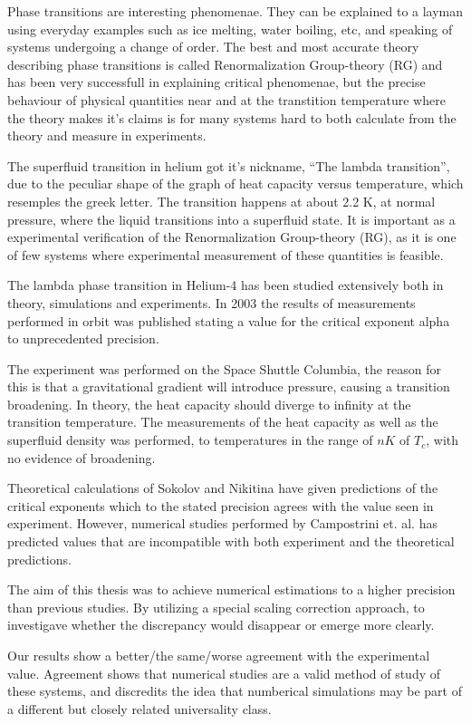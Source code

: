 %

Phase transitions are interesting phenomenae. They can be explained to a layman using everyday examples such as ice melting, water boiling, etc, and speaking of systems undergoing a change of order. The best and most accurate theory describing phase transitions is called Renormalization Group-theory (RG) and has been very successfull in explaining critical phenomenae, but the precise behaviour of physical quantities near and at the transtition temperature where the theory makes it's claims is for many systems hard to both calculate from the theory and measure in experiments.

The superfluid transition in helium got it's nickname, ``The lambda transition'', due to the peculiar shape of the graph of heat capacity versus temperature, which resemples the greek letter. The transition happens at about 2.2 K, at normal pressure, where the liquid transitions into a superfluid state. It is important as a experimental verification of the Renormalization Group-theory (RG), as it is one of few systems where experimental measurement of these quantities is feasible. 

The lambda phase transition in Helium-4 has been studied extensively both in theory, simulations and experiments. In 2003 the results of measurements performed in orbit was published\cite{Lipa2003} stating a value for the critical exponent alpha to unprecedented precision.

The experiment was performed on the Space Shuttle Columbia, the reason for this is that a gravitational gradient will introduce pressure, causing a transition broadening. In theory, the heat capacity should diverge to infinity at the transition temperature.
The measurements of the heat capacity as well as the superfluid density was performed, to temperatures in the range of $nK$ of $T_c$, with no evidence of broadening.

Theoretical calculations of Sokolov and Nikitina \cite{Sokolov2016} have given predictions of the critical exponents which to the stated precision agrees with the value seen in experiment.
However, numerical studies performed by Campostrini et. al. \cite{Campostrini2006} has predicted values that are incompatible with both experiment and the theoretical predictions. 

The aim of this thesis was to achieve numerical estimations to a higher precision than previous studies. By utilizing a special scaling correction approach, to investigave whether the discrepancy would disappear or emerge more clearly. 

Our results show a better/the same/worse agreement with the experimental value. Agreement shows that numerical studies are a valid method of study of these systems, and discredits the idea that numberical simulations may be part of a different but closely related universality class.


